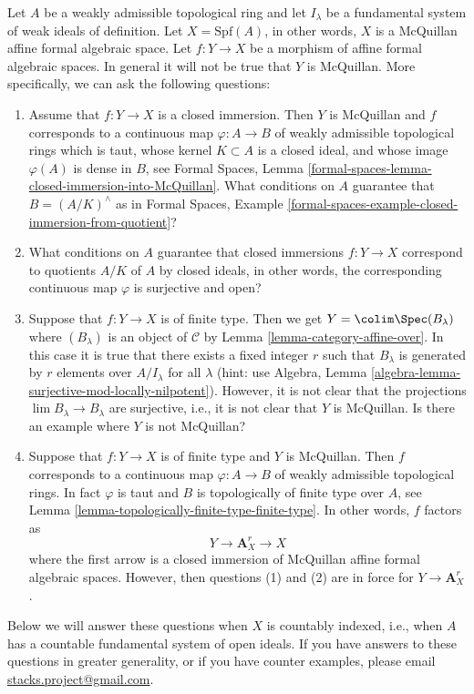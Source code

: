 \begin{remark}
\label{remark-questions}
Let $A$ be a weakly admissible topological ring and let $I_\lambda$
be a fundamental system of weak ideals of definition. Let $X = \text{Spf}(A)$,
in other words, $X$ is a McQuillan affine formal algebraic space.
Let $f : Y \to X$ be a morphism of affine formal algebraic spaces.
In general it will not be true that $Y$ is McQuillan. More specifically,
we can ask the following questions:
\begin{enumerate}
\item Assume that $f : Y \to X$ is a closed immersion. Then
$Y$ is McQuillan and $f$ corresponds to a continuous map
$\varphi : A \to B$ of weakly admissible topological rings
which is taut, whose kernel $K \subset A$ is a closed ideal, and
whose image $\varphi(A)$ is dense in $B$, see Formal Spaces, Lemma
\ref{formal-spaces-lemma-closed-immersion-into-McQuillan}.
What conditions on $A$ guarantee that $B = (A/K)^\wedge$ as in
Formal Spaces, Example
\ref{formal-spaces-example-closed-immersion-from-quotient}?
\item What conditions on $A$ guarantee that closed immersions
$f : Y \to X$ correspond to quotients $A/K$ of $A$ by closed ideals,
in other words, the corresponding continuous map $\varphi$ is surjective
and open?
\item Suppose that $f : Y \to X$ is of finite type. Then we get
$Y = \colim \Spec(B_\lambda)$ where $(B_\lambda)$ is an object of
$\mathcal{C}$ by Lemma \ref{lemma-category-affine-over}.
In this case it is true that there exists a fixed integer $r$ such
that $B_\lambda$ is generated by $r$ elements over $A/I_\lambda$ for
all $\lambda$ (hint: use
Algebra, Lemma \ref{algebra-lemma-surjective-mod-locally-nilpotent}).
However, it is not clear that the projections
$\lim B_\lambda \to B_\lambda$ are surjective, i.e.,
it is not clear that $Y$ is McQuillan.
Is there an example where $Y$ is not McQuillan?
\item Suppose that $f : Y \to X$ is of finite type and $Y$ is McQuillan.
Then $f$ corresponds to a continuous map $\varphi : A \to B$ of weakly
admissible topological rings. In fact $\varphi$ is taut and
$B$ is topologically of finite type over $A$, see
Lemma \ref{lemma-topologically-finite-type-finite-type}.
In other words, $f$ factors as
$$
Y \longrightarrow \mathbf{A}^r_X \longrightarrow X
$$
where the first arrow is a closed immersion of McQuillan affine
formal algebraic spaces. However, then questions (1) and
(2) are in force for $Y \to \mathbf{A}^r_X$.
\end{enumerate}
Below we will answer these questions when
$X$ is countably indexed, i.e., when $A$ has a countable fundamental
system of open ideals. If you have answers to these questions
in greater generality, or if you have counter examples, please email
\href{mailto:stacks.project@gmail.com}{stacks.project@gmail.com}.
\end{remark}

